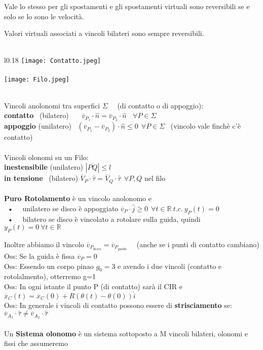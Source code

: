 \documentclass{article}
\begin{document}
Vale lo stesso per gli spostamenti e gli spostamenti virtuali sono reversibili se e solo se lo sono le velocità.

Valori virtuali associati a vincoli bilateri sono sempre reversibili. \ \ \ \ \ \ \ \ \ \ \ \ \ \ \ \ \ \ \ \ \ \ \ \ \ \ \ \ \ \ \ \ \ \ \ 
%
%
%
%
\begin{wrapfigure}{l}{0.18\textwidth}
\texttt{[image: Contatto.jpeg]} \\ \\
\texttt{[image: Filo.jpeg]}
\end{wrapfigure} \\
%
Vincoli anolonomi tra superfici $\Sigma$ \ \ (di contatto o di appoggio):\\
\textbf{contatto} \ (bilatero) \ \ \ $\overline{v}_{P_1}\cdot\hat{n} =\overline{v}_{P_2}\cdot\hat{n} \ \ \ \ \forall P \in \Sigma$ \\
\textbf{appoggio} (unilatero) \ $(\overline{v}_{P_1} -\overline{v}_{P_2})\cdot\hat{n} \leq 0 \ \ \forall P \in \Sigma$ \ (vincolo vale finchè c'è contatto) \linebreak \\ \\
%
%
Vincoli olonomi su un Filo:\\
\textbf{inestensibile} (unilatero) $|\overline{PQ}| \leq l$\\
\textbf{in tensione} \ (bilatero) $\overline{V}_P\cdot \hat{\tau} = \overline{V}_Q\cdot\hat{\tau} \ \ \forall P,Q$ nel filo \\ \\
%
%
%
\textbf{Puro Rotolamento} è un vincolo anolonomo e\\
\ • \ \ unilatero se disco è appoggiato $\overline{v}_P  \cdot \hat{j} \geq 0 \ \ \forall t \in \mathbb{R} \ t.c. \ y_P(t)=0$\\
\ • \ \ bilatero se disco è vincolato a rotolare sulla guida, quindi \ \ $y_P(t)=0 \ \forall t \in \mathbb{R}$

Inoltre abbiamo il vincolo $\overline{v}_{P_{disco}}=\overline{v}_{P_{guida}}$ \ \ (anche se i punti di contatto cambiano) \\
Oss: Se la guida è fissa $\overline{v}_P=0$\\
Oss: Essendo un corpo pinao $g_0=3$ e avendo i due vincoli (contatto e rotolalmento), otterremo g=1 \\
Oss: In ogni istante il punto P (di contatto) sarà il CIR e \ \  $\overline{x}_C(t)=\overline{x}_C(0) + R(\theta(t) - \theta(0))\hat{i}$ \\
Oss: In generale i vincoli di contatto possono essere di \textbf{strisciamento} se: $\overline{v}_{A_1} \cdot \hat{\tau} \neq \overline{v}_{A_2} \cdot \hat{\tau}$ \\ \\
%
%
%
Un \textbf{Sistema olonomo} è un sistema sottoposto a M vincoli bilateri, olonomi e fissi che assumeremo
\end{document}
